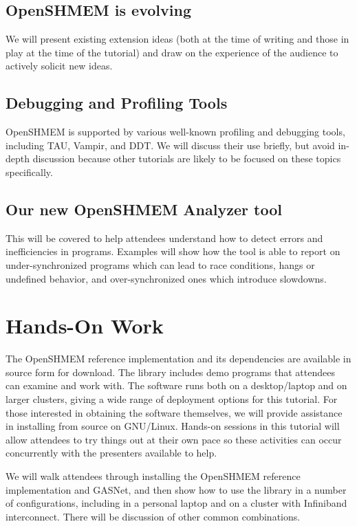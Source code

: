 \documentclass[10pt,english]{article}
\begin{document}
\subsection{OpenSHMEM is evolving}

  We will present existing extension ideas (both at the time of
  writing and those in play at the time of the tutorial) and draw on
  the experience of the audience to actively solicit new ideas.

\subsection{Debugging and Profiling Tools}

  OpenSHMEM is supported by various well-known profiling and debugging
  tools, including TAU, Vampir, and DDT.  We will discuss their use
  briefly, but avoid in-depth discussion because other tutorials are
  likely to be focused on these topics specifically.

\subsection{Our new OpenSHMEM Analyzer tool}

  This will be covered to help attendees understand how to detect
  errors and inefficiencies in programs.  Examples will show how the
  tool is able to report on under-synchronized programs which can lead
  to race conditions, hangs or undefined behavior, and
  over-synchronized ones which introduce slowdowns.

\section{Hands-On Work}

The OpenSHMEM reference implementation and its dependencies are
available in source form for download.  The library includes demo
programs that attendees can examine and work with.  The software runs
both on a desktop/laptop and on larger clusters, giving a wide range
of deployment options for this tutorial.  For those interested in
obtaining the software themselves, we will provide assistance in
installing from source on GNU/Linux.  Hands-on sessions in this
tutorial will allow attendees to try things out at their own pace so
these activities can occur concurrently with the presenters available
to help.

We will walk attendees through installing the OpenSHMEM reference
implementation and GASNet, and then show how to use the library in a
number of configurations, including in a personal laptop and on a
cluster with Infiniband interconnect.  There will be discussion of
other common combinations.
\end{document}
